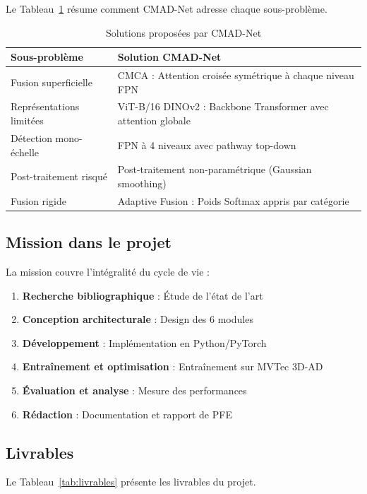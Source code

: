 \documentclass[12pt,a4paper,oneside]{report}
\begin{document}
Le Tableau~\ref{tab:solutions} résume comment CMAD-Net adresse chaque sous-problème.

\begin{table}[H]
\centering
\caption{Solutions proposées par CMAD-Net}
\label{tab:solutions}
\begin{tabularx}{\textwidth}{X X}
\toprule
\textbf{Sous-problème} & \textbf{Solution CMAD-Net} \\
\midrule
\rowcolor{tableheader} Fusion superficielle & CMCA : Attention croisée symétrique à chaque niveau FPN \\
Représentations limitées & ViT-B/16 DINOv2 : Backbone Transformer avec attention globale \\
\rowcolor{tableheader} Détection mono-échelle & FPN à 4 niveaux avec pathway top-down \\
Post-traitement risqué & Post-traitement non-paramétrique (Gaussian smoothing) \\
\rowcolor{tableheader} Fusion rigide & Adaptive Fusion : Poids Softmax appris par catégorie \\
\bottomrule
\end{tabularx}
\end{table}

\subsection{Mission dans le projet}

La mission couvre l'intégralité du cycle de vie :
\begin{enumerate}
    \item \textbf{Recherche bibliographique} : Étude de l'état de l'art
    \item \textbf{Conception architecturale} : Design des 6 modules
    \item \textbf{Développement} : Implémentation en Python/PyTorch
    \item \textbf{Entraînement et optimisation} : Entraînement sur MVTec 3D-AD
    \item \textbf{Évaluation et analyse} : Mesure des performances
    \item \textbf{Rédaction} : Documentation et rapport de PFE
\end{enumerate}

\subsection{Livrables}

Le Tableau~\ref{tab:livrables} présente les livrables du projet.
\end{document}
